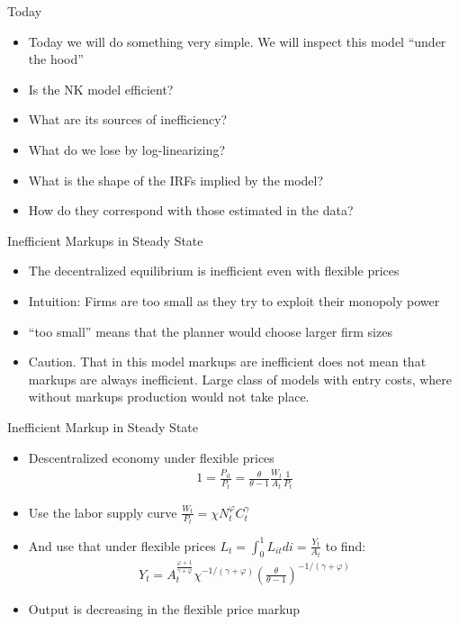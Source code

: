 \documentclass[11pt,aspectratio=169,xcolor={dvipsnames},hyperref={pdftex,pdfpagemode=UseNone,hidelinks,pdfdisplaydoctitle=true},usepdftitle=false]{beamer}
\begin{document}
\begin{frame}{Today}
\begin{itemize}
\item Today we will do something very simple. We will inspect this model ``under the hood''
\item Is the NK model efficient?
\item What are its sources of inefficiency?
\item What do we lose by log-linearizing?
\item What is the shape of the IRFs implied by the model?
\item How do they correspond with those estimated in the data?
\end{itemize}
\end{frame}


\begin{frame}{Inefficient Markups in Steady State}
\begin{itemize}
\item The decentralized equilibrium is inefficient even with flexible prices
\item Intuition: Firms are too small as they try to exploit their monopoly power
\item ``too small'' means that the planner would choose larger firm sizes
\item Caution. That in this model markups are inefficient does not mean that markups are always inefficient. Large class of models with entry costs, where without markups production would not take place.
\end{itemize}
\end{frame}

\begin{frame}{Inefficient Markup in Steady State}
\begin{itemize}
\item Descentralized economy under flexible prices
\begin{align*}
1 = \frac{P_{it}}{P_t} = \frac{\theta}{\theta-1} \frac{W_t}{A_t} \frac{1}{P_t}
\end{align*} 
\item Use the labor supply curve $\frac{W_t}{P_t} = \chi N_t^{\varphi}C_t^{\gamma}$
\item And use that under flexible prices $L_t = \int_0^1 L_{it} di = \frac{Y_t}{A_t}$ to find:
\begin{align*}
Y_t = A^{\frac{\varphi+1}{\gamma + \varphi}}_t \chi^{-1/(\gamma + \varphi)} \left(\frac{\theta}{\theta-1}\right)^{-1/(\gamma + \varphi)}
\end{align*}
\item Output is decreasing in the flexible price markup
\end{itemize}
\end{frame}
\end{document}
